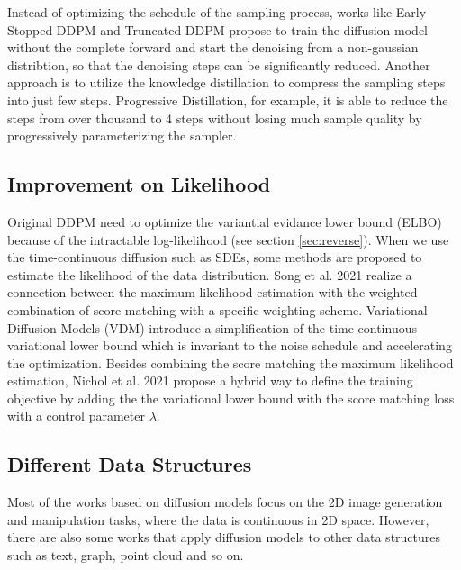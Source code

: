 \documentclass[12pt,DIV14,BCOR12mm,a4paper,footinclude=false,headinclude,parskip=half-,twoside,openright,cleardoublepage=empty,toc=index,bibliography=totoc,listof=totoc]{scrreprt}
\numberwithin{equation}{chapter}
\begin{document}
Instead of optimizing the schedule of the sampling process, works like Early-Stopped DDPM \cite{lyu2022conditional} and Truncated DDPM \cite{zheng2023truncated} propose to train the diffusion model without the complete forward and start the denoising from a non-gaussian distribtion, so that the denoising steps can be significantly reduced. Another approach is to utilize the knowledge distillation \cite{salimans2022progressive,meng2023distillation} to compress the sampling steps into just few steps. Progressive Distillation, for example, it is able to reduce the steps from over thousand to 4 steps without losing much sample quality by progressively parameterizing the sampler.
\subsection{Improvement on Likelihood}
Original DDPM need to optimize the variantial evidance lower bound (ELBO) because of the intractable log-likelihood (see section \ref{sec:reverse}). When we use the time-continuous diffusion such as SDEs, some methods are proposed to estimate the likelihood of the data distribution. Song et al. 2021 \cite{song2021maximum} realize a connection between the maximum likelihood estimation with the weighted combination of score matching with a specific weighting scheme. Variational Diffusion Models (VDM) \cite{kingma2023variational} introduce a simplification of the time-continuous variational lower bound which is invariant to the noise schedule and accelerating the optimization. Besides combining the score matching the maximum likelihood estimation, Nichol et al. 2021 \cite{nichol2021improved} propose a hybrid way to define the training objective by adding the the variational lower bound with the score matching loss with a control parameter $\lambda$.

\subsection{Different Data Structures}
Most of the works based on diffusion models focus on the 2D image generation and manipulation tasks, where the data is continuous in 2D space. However, there are also some works that apply diffusion models to other data structures such as text, graph, point cloud and so on.
\end{document}
